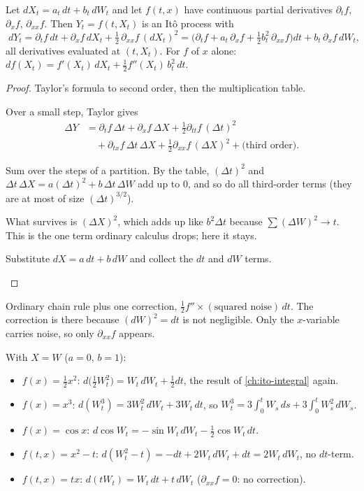 \begin{theorem}
\label{thm:ito}
Let $dX_t=a_t\,dt+b_t\,dW_t$ and let $f(t,x)$ have continuous partial derivatives $\partial_tf$, $\partial_xf$, $\partial_{xx}f$. Then $Y_t=f(t,X_t)$ is an Itô process with
\[
  \boxed{\;dY_t=\partial_tf\,dt+\partial_xf\,dX_t+\tfrac12\,\partial_{xx}f\,(dX_t)^2
  =\Big(\partial_tf+a_t\,\partial_xf+\tfrac12b_t^2\,\partial_{xx}f\Big)dt+b_t\,\partial_xf\,dW_t,\;}
\]
all derivatives evaluated at $(t,X_t)$. For $f$ of $x$ alone: $df(X_t)=f'(X_t)\,dX_t+\frac12f''(X_t)\,b_t^2\,dt$.
\end{theorem}
\begin{proof}
Taylor's formula to second order, then the multiplication table.
\begin{steps}
  \item Over a small step, Taylor gives
  \[
    \begin{aligned}
    \Delta Y&=\partial_tf\,\Delta t+\partial_xf\,\Delta X+\tfrac12\partial_{tt}f\,(\Delta t)^2\\
    &\quad+\partial_{tx}f\,\Delta t\,\Delta X+\tfrac12\partial_{xx}f\,(\Delta X)^2+\text{(third order)}.
    \end{aligned}
  \]
  \item Sum over the steps of a partition. By the table, $(\Delta t)^2$ and $\Delta t\,\Delta X=a(\Delta t)^2+b\,\Delta t\,\Delta W$ add up to $0$, and so do all third-order terms (they are at most of size $(\Delta t)^{3/2}$).
  \item What survives is $(\Delta X)^2$, which adds up like $b^2\Delta t$ because $\sum(\Delta W)^2\to t$. This is the one term ordinary calculus drops; here it stays.
  \item Substitute $dX=a\,dt+b\,dW$ and collect the $dt$ and $dW$ terms. \qedhere
\end{steps}
\end{proof}

\begin{intuition}
Ordinary chain rule plus one correction, $\frac12f''\times(\text{squared noise})\,dt$. The correction is there because $(dW)^2=dt$ is not negligible. Only the $x$-variable carries noise, so only $\partial_{xx}f$ appears.
\end{intuition}

\begin{example}
\label{ex:ito-first}
With $X=W$ ($a=0$, $b=1$):
\begin{itemize}
  \item $f(x)=\frac12x^2$: $d\big(\frac12W_t^2\big)=W_t\,dW_t+\frac12dt$, the result of \cref{ch:ito-integral} again.
  \item $f(x)=x^3$: $d(W_t^3)=3W_t^2\,dW_t+3W_t\,dt$, so $W_t^3=3\int_0^tW_s\,ds+3\int_0^tW_s^2\,dW_s$.
  \item $f(x)=\cos x$: $d\cos W_t=-\sin W_t\,dW_t-\frac12\cos W_t\,dt$.
  \item $f(t,x)=x^2-t$: $d(W_t^2-t)=-dt+2W_t\,dW_t+dt=2W_t\,dW_t$, no $dt$-term.
  \item $f(t,x)=tx$: $d(tW_t)=W_t\,dt+t\,dW_t$ ($\partial_{xx}f=0$: no correction).
\end{itemize}
\end{example}

